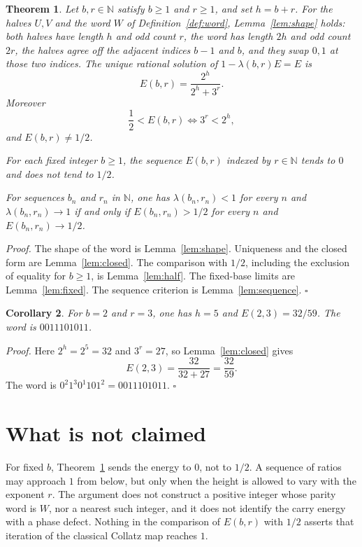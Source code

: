\documentclass[11pt,letterpaper]{article}
\newcommand{\N}{\mathbb{N}}
\newtheorem{theorem}{Theorem}
\newtheorem{corollary}[theorem]{Corollary}
\newenvironment{proof}{\noindent\textit{Proof.}}{\hfill\(\square\)}
\begin{document}
\begin{theorem}
\label{thm:sharp}
Let \(b,r\in\N\) satisfy \(b\geq 1\) and \(r\geq 1\), and set \(h=b+r\). For the halves \(U,V\) and the word \(W\) of Definition~\ref{def:word}, Lemma~\ref{lem:shape} holds: both halves have length \(h\) and odd count \(r\), the word has length \(2h\) and odd count \(2r\), the halves agree off the adjacent indices \(b-1\) and \(b\), and they swap \(0,1\) at those two indices. The unique rational solution of \(1-\lambda(b,r)E=E\) is
\[
E(b,r)=\frac{2^{h}}{2^{h}+3^{r}}.
\]
Moreover
\[
\frac{1}{2}<E(b,r)\iff 3^{r}<2^{h},
\]
and \(E(b,r)\neq 1/2\).

For each fixed integer \(b\geq 1\), the sequence \(E(b,r)\) indexed by \(r\in\N\) tends to \(0\) and does not tend to \(1/2\).

For sequences \(b_{n}\) and \(r_{n}\) in \(\N\), one has \(\lambda(b_{n},r_{n})<1\) for every \(n\) and \(\lambda(b_{n},r_{n})\to 1\) if and only if \(E(b_{n},r_{n})>1/2\) for every \(n\) and \(E(b_{n},r_{n})\to 1/2\).
\end{theorem}

\begin{proof}
The shape of the word is Lemma~\ref{lem:shape}. Uniqueness and the closed form are Lemma~\ref{lem:closed}. The comparison with \(1/2\), including the exclusion of equality for \(b\geq 1\), is Lemma~\ref{lem:half}. The fixed-base limits are Lemma~\ref{lem:fixed}. The sequence criterion is Lemma~\ref{lem:sequence}.
\end{proof}

\begin{corollary}
\label{cor:example}
For \(b=2\) and \(r=3\), one has \(h=5\) and \(E(2,3)=32/59\). The word is \(0011101011\).
\end{corollary}

\begin{proof}
Here \(2^{h}=2^{5}=32\) and \(3^{r}=27\), so Lemma~\ref{lem:closed} gives
\[
E(2,3)=\frac{32}{32+27}=\frac{32}{59}.
\]
The word is \(0^{2}1^{3}0^{1}101^{2}=0011101011\).
\end{proof}

\section{What is not claimed}

For fixed \(b\), Theorem~\ref{thm:sharp} sends the energy to \(0\), not to \(1/2\). A sequence of ratios may approach \(1\) from below, but only when the height is allowed to vary with the exponent \(r\). The argument does not construct a positive integer whose parity word is \(W\), nor a nearest such integer, and it does not identify the carry energy with a phase defect. Nothing in the comparison of \(E(b,r)\) with \(1/2\) asserts that iteration of the classical Collatz map reaches \(1\).
\end{document}
